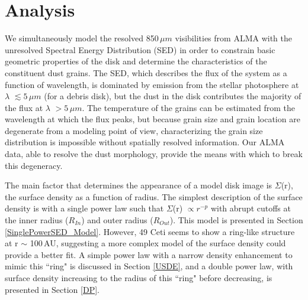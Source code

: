 \chapter{Analysis}
\label{chap4}

We simultaneously model the resolved 850$\,\mu m$ visibilities from ALMA with the unresolved Spectral Energy Distribution (SED) in order to constrain basic geometric properties of the disk and determine the characteristics of the constituent dust grains. The SED, which describes the flux of the system as a function of wavelength, is dominated by emission from the stellar photosphere at $\lambda$ $\lesssim 5\,\mu m$ (for a debris disk), but the dust in the disk contributes the majority of the flux at $\lambda$ $> 5\,\mu m$. The temperature of the grains can be estimated from the wavelength at which the flux peaks, but because grain size and grain location are degenerate from a modeling point of view, characterizing the grain size distribution is impossible without spatially resolved information. Our ALMA data, able to resolve the dust morphology, provide the means with which to break this degeneracy. 

The main factor that determines the appearance of a model disk image is $\Sigma$(r), the surface density as a function of radius. The simplest description of the surface density is with a single power law such that $\Sigma$(r) $\propto r^{-p}$ with abrupt cutoffs at the inner radius ($R_{In}$) and outer radius ($R_{Out}$). This model is presented in Section \ref{SinglePowerSED_Model}. However, 49 Ceti seems to show a ring-like structure at r $\sim$ 100\,AU, suggesting a more complex model of the surface density could provide a better fit. A simple power law with a narrow density enhancement to mimic this ``ring" is discussed in Section \ref{USDE}, and a double power law, with surface density increasing to the radius of this ``ring" before decreasing, is presented in Section \ref{DP}. 

